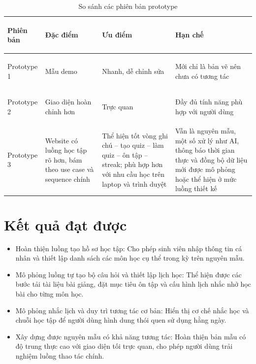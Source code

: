 \documentclass[12pt,a4paper]{report}
\begin{document}
\begin{table}[H]
\centering
\caption{So sánh các phiên bản prototype}
\small
\setlength{\tabcolsep}{4pt}
\begin{tabularx}{\textwidth}{>{\bfseries\raggedright\arraybackslash}p{2.6cm}YYY}
\toprule
\textbf{Phiên bản} & \textbf{Đặc điểm} & \textbf{Ưu điểm} & \textbf{Hạn chế} \\
\midrule
Prototype 1 & Mẫu demo & Nhanh, dễ chỉnh sửa & Mới chỉ là bản vẽ nên chưa có tương tác \\
Prototype 2 & Giao diện hoàn chỉnh hơn & Trực quan & Đầy đủ tính năng phù hợp với người dùng \\
Prototype 3 & Website có luồng học tập rõ hơn, bám theo use case và sequence chính & Thể hiện tốt vòng ghi chú -- tạo quiz -- làm quiz -- ôn tập -- streak; phù hợp hơn với nhu cầu học trên laptop và trình duyệt & Vẫn là nguyên mẫu, một số xử lý như AI, thông báo thời gian thực và đồng bộ dữ liệu mới được mô phỏng hoặc thể hiện ở mức luồng thiết kế \\
\bottomrule
\end{tabularx}
\end{table}

\section{Kết quả đạt được}
\begin{itemize}
  \item Hoàn thiện luồng tạo hồ sơ học tập: Cho phép sinh viên nhập thông tin cá nhân và thiết lập danh sách các môn học cụ thể trong kỳ trên nguyên mẫu.
  \item Mô phỏng luồng tự tạo bộ câu hỏi và thiết lập lịch học: Thể hiện được các bước tải tài liệu bài giảng, đặt mục tiêu ôn tập và cấu hình lịch nhắc nhở học bài cho từng môn học.
  \item Mô phỏng nhắc lịch và duy trì tương tác cơ bản: Hiển thị cơ chế nhắc học và chuỗi học tập để người dùng hình dung thói quen sử dụng hằng ngày.
  \item Xây dựng được nguyên mẫu có khả năng tương tác: Hoàn thiện bản mẫu có độ trung thực cao với giao diện tối trực quan, cho phép người dùng trải nghiệm luồng thao tác chính.
\end{itemize}
\end{document}
